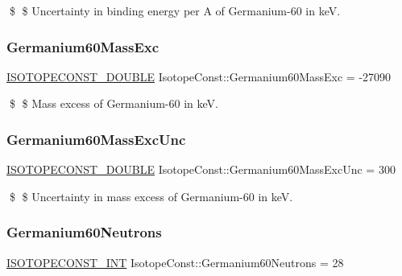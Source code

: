 \$ \$ Uncertainty in binding energy per A of Germanium-\/60 in keV. \mbox{\label{group___isotope_const-_germanium-_ge60_ga9b03ee9a53f8ceb2b48bff3011852f97}} 
\subsubsection{\texorpdfstring{Germanium60\+Mass\+Exc}{Germanium60MassExc}}
{\footnotesize\ttfamily \mbox{\hyperlink{group___isotope_const-_macros_ga8f45a7272ce02c0b4c65c44636ed719a}{I\+S\+O\+T\+O\+P\+E\+C\+O\+N\+S\+T\+\_\+\+D\+O\+U\+B\+LE}} Isotope\+Const\+::\+Germanium60\+Mass\+Exc = -\/27090}

\$ \$ Mass excess of Germanium-\/60 in keV. \mbox{\label{group___isotope_const-_germanium-_ge60_ga5cf7fb70c2dc4f9bf1e264ae53c433e2}} 
\subsubsection{\texorpdfstring{Germanium60\+Mass\+Exc\+Unc}{Germanium60MassExcUnc}}
{\footnotesize\ttfamily \mbox{\hyperlink{group___isotope_const-_macros_ga8f45a7272ce02c0b4c65c44636ed719a}{I\+S\+O\+T\+O\+P\+E\+C\+O\+N\+S\+T\+\_\+\+D\+O\+U\+B\+LE}} Isotope\+Const\+::\+Germanium60\+Mass\+Exc\+Unc = 300}

\$ \$ Uncertainty in mass excess of Germanium-\/60 in keV. \mbox{\label{group___isotope_const-_germanium-_ge60_ga70b4c73dcee3d5ffde6ed9333594ea14}} 
\subsubsection{\texorpdfstring{Germanium60\+Neutrons}{Germanium60Neutrons}}
{\footnotesize\ttfamily \mbox{\hyperlink{group___isotope_const-_macros_ga5f18360b3e99483a35c32d789e62621c}{I\+S\+O\+T\+O\+P\+E\+C\+O\+N\+S\+T\+\_\+\+I\+NT}} Isotope\+Const\+::\+Germanium60\+Neutrons = 28}

